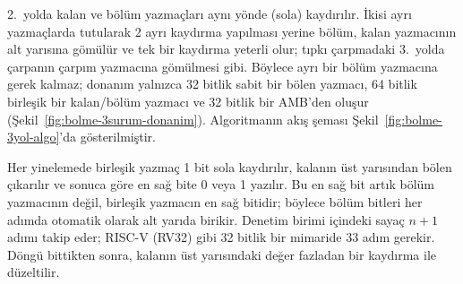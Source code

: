2.\ yolda kalan ve bölüm yazmaçları aynı yönde (sola) kaydırılır. İkisi ayrı yazmaçlarda tutularak 2 ayrı kaydırma yapılması yerine bölüm, kalan yazmacının alt yarısına gömülür ve tek bir kaydırma yeterli olur; tıpkı çarpmadaki 3.\ yolda çarpanın çarpım yazmacına gömülmesi gibi. Böylece ayrı bir bölüm yazmacına gerek kalmaz; donanım yalnızca 32 bitlik sabit bir bölen yazmacı, 64 bitlik birleşik bir kalan/bölüm yazmacı ve 32 bitlik bir AMB'den oluşur (Şekil~\ref{fig:bolme-3surum-donanim}). Algoritmanın akış şeması Şekil~\ref{fig:bolme-3yol-algo}'da gösterilmiştir.

Her yinelemede birleşik yazmaç 1 bit sola kaydırılır, kalanın üst yarısından bölen çıkarılır ve sonuca göre en sağ bite 0 veya 1 yazılır. Bu en sağ bit artık bölüm yazmacının değil, birleşik yazmacın en sağ bitidir; böylece bölüm bitleri her adımda otomatik olarak alt yarıda birikir. Denetim birimi içindeki sayaç $n{+}1$ adımı takip eder; RISC-V (RV32) gibi 32 bitlik bir mimaride 33 adım gerekir. Döngü bittikten sonra, kalanın üst yarısındaki değer fazladan bir kaydırma ile düzeltilir.

